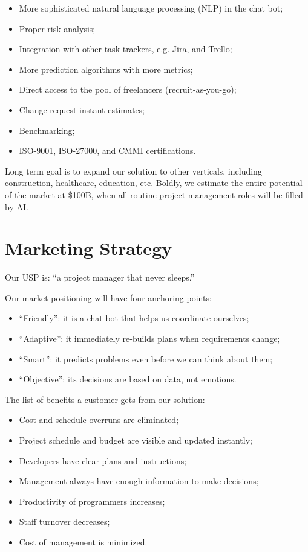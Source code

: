 \documentclass{main}
\begin{document}
\begin{itemize}\itemsep0em
  \item More sophisticated natural language processing (NLP) in the chat bot;
  \item Proper risk analysis;
  \item Integration with other task trackers, e.g. Jira, and Trello;
  \item More prediction algorithms with more metrics;
  \item Direct access to the pool of freelancers (recruit-as-you-go);
  \item Change request instant estimates;
  \item Benchmarking;
  \item ISO-9001, ISO-27000, and CMMI certifications.
\end{itemize}

Long term goal is to expand our solution to other verticals, including
construction, healthcare, education, etc. Boldly, we estimate the entire
potential of the market at \$100B, when all routine project management roles will
be filled by AI.

\section{Marketing Strategy}

Our USP is: ``a project manager that never sleeps.''

Our market positioning will have four anchoring points:

\begin{itemize}\itemsep0em
  \item ``Friendly'': it is a chat bot that helps us coordinate ourselves;
  \item ``Adaptive'': it immediately re-builds plans when requirements change;
  \item ``Smart'': it predicts problems even before we can think about them;
  \item ``Objective'': its decisions are based on data, not emotions.
\end{itemize}

The list of benefits a customer gets from our solution:

\begin{itemize}\itemsep0em
  \item Cost and schedule overruns are eliminated;
  \item Project schedule and budget are visible and updated instantly;
  \item Developers have clear plans and instructions;
  \item Management always have enough information to make decisions;
  \item Productivity of programmers increases;
  \item Staff turnover decreases;
  \item Cost of management is minimized.
\end{itemize}
\end{document}
